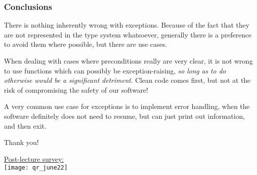 \documentclass[aspectratio=169]{beamer}
\begin{document}
\begin{frame}[fragile]
  \frametitle{Conclusions}

  There is nothing inherently wrong with exceptions. Because of the fact that
  they are not represented in the type system whatsoever, generally there is a
  preference to avoid them where possible, but there are use cases.

  \pause
  \vspace{\fill}

  When dealing with cases where preconditions really are very clear, it is not
  wrong to use functions which can possibly be exception-raising, \textit{so
  long as to do otherwise would be a significant detriment}. Clean code comes
  first, but not at the risk of compromising the safety of our software! 

  \pause
  \vspace{\fill}

  A very common use case for exceptions is to implement error handling, when
  the software definitely does not need to resume, but can just print out
  information, and then exit.
\end{frame}


\begin{frame}[plain]
	\begin{center} Thank you! \end{center}

	\begin{center} 
    {\color{blue} \href{https://docs.google.com/forms/d/e/1FAIpQLSf7yaK02wbqwWgBHUMDapwgQYGXkhFVuivS6GdToCJ11zUCrQ/viewform?usp=sf_link}{Post-lecture survey:}} \\
    \vspace{5pt}
    \texttt{[image: qr\_june22]}
  \end{center}
\end{frame}
\end{document}
